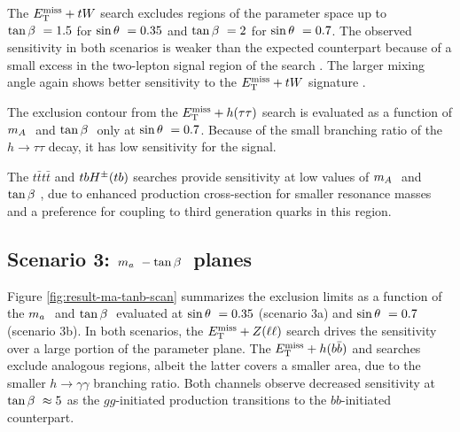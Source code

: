 The $E_{\mathrm{T}}^{\mathrm{miss}}+tW$ search excludes regions of the parameter space up to $\tan\beta~=1.5$ for $\sin\theta~=0.35$ and $\tan\beta~=2$ for $\sin\theta~=0.7$. The observed sensitivity in both scenarios is weaker than the expected counterpart because of a small excess in the two-lepton signal region of the search \cite{EXOT-2018-43}. The larger mixing angle again shows better sensitivity to the $E_{\mathrm{T}}^{\mathrm{miss}}+tW$ signature \cite{Pani:2017qyd}. 

The exclusion contour from the $E_{\mathrm{T}}^{\mathrm{miss}}+h(\tau\tau)$ search is evaluated as a function of $m_A~$ and $\tan\beta~$ only at $\sin\theta~=0.7$. Because of the small branching ratio of the $h\rightarrow \tau\tau$ decay, it has low sensitivity for the \thdma signal. 

The $t\bar{t}t\bar{t}$ and $tbH^{\pm}(tb)$ searches provide sensitivity at low values of $m_A~$ and $\tan\beta~$, due to enhanced production cross-section for smaller resonance masses and a preference for coupling to third generation quarks in this region.

\subsection{Scenario 3: \texorpdfstring{$m_a~-\tan\beta~$}{TEXT} planes}

Figure \ref{fig:result-ma-tanb-scan} summarizes the exclusion limits as a function of the $m_a~$ and $\tan\beta~$ evaluated at $\sin\theta~ = 0.35$ (scenario 3a) and $\sin\theta~ = 0.7$ (scenario 3b). In both scenarios, the $E_{\mathrm{T}}^{\mathrm{miss}}+Z(\ell\ell)$ search drives the sensitivity over a large portion of the parameter plane. The $E_{\mathrm{T}}^{\mathrm{miss}}+h(b\bar{b})$ and \monohgamgam searches exclude analogous regions, albeit the latter covers a smaller area, due to the smaller $h\rightarrow \gamma\gamma$ branching ratio. Both channels observe decreased sensitivity at $\tan\beta~\approx 5$ as the $gg$-initiated production transitions to the $bb$-initiated counterpart. 

